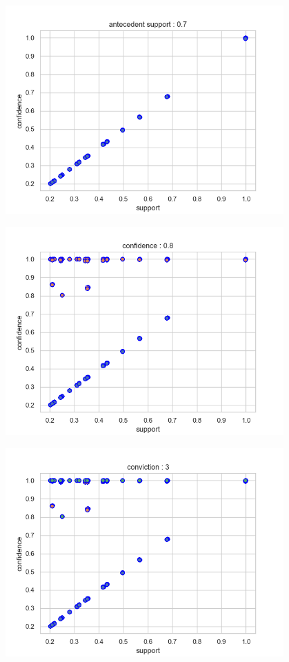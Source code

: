 \documentclass{article}
\begin{document}
{\begin{center}
\end{center}
    \begin{center}
    \includegraphics[width=0.8\textwidth]{1.png}\newline
\end{center}
    \begin{center}
    \includegraphics[width=0.8\textwidth]{2co.png}\newline
\end{center}
    \begin{center}
    \includegraphics[width=0.8\textwidth]{3convi.png}\newline

\end{center}}
\end{document}
